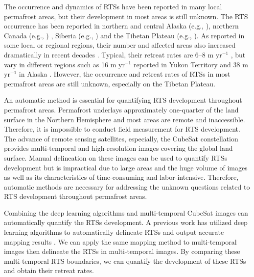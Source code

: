 \documentclass[authoryear,preprint,review,12pt]{elsarticle}
\begin{document}
The occurrence and dynamics of RTSs have been reported in many local permafrost areas, but their development in most areas is still unknown. 
The RTS occurrence has been reported in northern and central Alaska (e.g., \citealp{swanson2018growth,balser2014timing}), northern Canada (e.g., \citealp{burn1990canadian, cassidy2017impacts, armstrong2018thaw,lewkowicz2019extremes}) , Siberia (e.g., \citealp{leibman2003dynamics, zwieback2018sub}) and the Tibetan Plateau (e.g., \citealp{niu2005engineering, niu2016thaw}). 
As reported in some local or regional regions, their number and affected areas also increased dramatically in recent decades \citep{luo2019recent, lewkowicz2019extremes}.
Typical, their retreat rates are 6--8 m yr$^{-1}$ \citep{jorgenson_thermokarst_2013}, but vary in different regions such as 16 m yr$^{-1}$ reported in Yukon Territory \citep{burn1989geomorphology} and 38 m yr$^{-1}$  in Alaska \citep{swanson2018growth}.
However, the occurrence and retreat rates of RTSs in most permafrost areas are still unknown, especially on the Tibetan Plateau. 

An automatic method is essential for quantifying RTS development throughout permafrost areas. 
Permafrost underlays approximately one-quarter of the land surface in the Northern Hemisphere \citep{zhang1999statistics} and most areas are remote and inaccessible. 
Therefore, it is impossible to conduct field measurement for RTS development. 
The advance of remote sensing satellites, especially, the CubeSat constellation provides multi-temporal and high-resolution images covering the global land surface. 
Manual delineation on these images can be used to quantify RTSs development but is impractical due to large areas and the huge volume of images as well as its characteristics of time-consuming and labor-intensive. 
Therefore, automatic methods are necessary for addressing the unknown questions related to RTS development throughout permafrost areas. 


Combining the deep learning algorithms and multi-temporal CubeSat images can automatically quantify the RTSs development.
A previous work has utilized deep learning algorithms to automatically delineate RTSs and output accurate mapping results \citep{huang2020using}. 
We can apply the same mapping method to multi-temporal images then delineate the RTSs in multi-temporal images. 
By comparing these multi-temporal RTS boundaries, we can quantify the development of these RTSs and obtain their retreat rates. 
\end{document}
